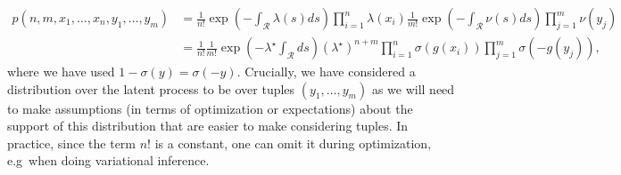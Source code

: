 \documentclass{article}
\newcommand{\calR}{\mathcal{R}}
\newcommand{\ls}{\lambda(s)}
\newcommand{\ns}{\nu(s)}
\newcommand{\sigmoid}{\sigma}
\begin{document}
	 \begin{align}
	 p(n, m, x_1, \ldots, x_n, y_1, \ldots, y_m) &= 	\frac{1}{n!} \exp\left(-\int_{\calR} \ls ds\right) \prod_{i=1}^{n}  {\lambda(x_i)} 	\frac{1}{m!} \exp\left(-\int_{\calR} \ns ds\right) \prod_{j=1}^{m}  {\nu(y_j)}  \\
	 &= \frac{1}{n!} \frac{1}{m!}  \exp \left(- \lambda^{\star} \int_{\calR} ds \right) (\lambda^{\star})^{n+m} \prod_{i=1}^{n}  \sigma(g(x_i)) \prod_{j=1}^{m} \sigma(- g(y_j)) ,
	 \end{align}
	  where we have used $1 - \sigmoid(y) = \sigmoid(-y)$. Crucially, we have considered a distribution over the latent process to be over tuples $(y_1, \ldots, y_m)$ as we will need to make assumptions (in terms of optimization or expectations) about the support of this distribution that are easier to make considering tuples. In practice, since the term $n!$ is a constant, one can omit it during optimization, e.g~when doing variational inference. 
\end{document}
